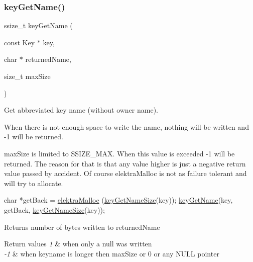 \subsubsection{\texorpdfstring{key\+Get\+Name()}{keyGetName()}}
{\footnotesize\ttfamily ssize\+\_\+t key\+Get\+Name (\begin{DoxyParamCaption}\item[{const Key $\ast$}]{key,  }\item[{char $\ast$}]{returned\+Name,  }\item[{size\+\_\+t}]{max\+Size }\end{DoxyParamCaption})}



Get abbreviated key name (without owner name). 

When there is not enough space to write the name, nothing will be written and -\/1 will be returned.

max\+Size is limited to S\+S\+I\+Z\+E\+\_\+\+M\+AX. When this value is exceeded -\/1 will be returned. The reason for that is that any value higher is just a negative return value passed by accident. Of course elektra\+Malloc is not as failure tolerant and will try to allocate.


\begin{DoxyCode}
\textcolor{keywordtype}{char} *getBack = \hyperlink{internal_8c_a35cdc2e5caed3454cb73b4fc7f37858c}{elektraMalloc} (\hyperlink{group__keyname_gabdbcfa51ed8a387e47ead207affa2d2e}{keyGetNameSize}(key));
\hyperlink{group__keyname_gab29a850168d9b31c9529e90cf9ab68be}{keyGetName}(key, getBack, \hyperlink{group__keyname_gabdbcfa51ed8a387e47ead207affa2d2e}{keyGetNameSize}(key));
\end{DoxyCode}


\begin{DoxyReturn}{Returns}
number of bytes written to {\ttfamily returned\+Name} 
\end{DoxyReturn}

\begin{DoxyRetVals}{Return values}
{\em 1} & when only a null was written \\
\hline
{\em -\/1} & when keyname is longer then max\+Size or 0 or any N\+U\+LL pointer \\
\hline
\end{DoxyRetVals}

